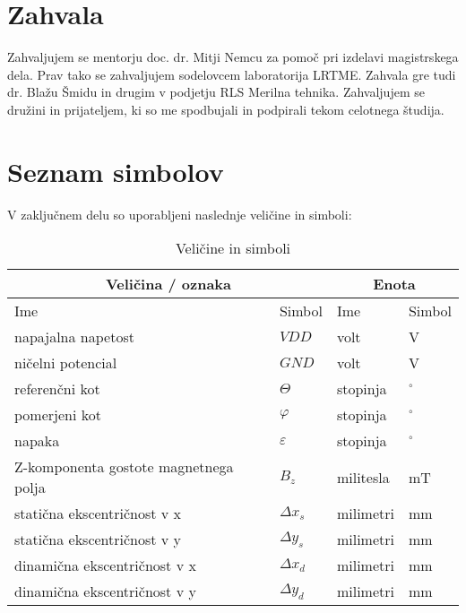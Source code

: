 \documentclass[a4paper,twoside,openright,12pt]{book}
\date{Ljubljana, 2018}
\begin{document}
\frontmatter
\maketitle
\chapter*{Zahvala}
Zahvaljujem se mentorju doc. dr. Mitji Nemcu za pomoč pri izdelavi magistrskega dela. Prav tako se zahvaljujem sodelovcem laboratorija LRTME.
Zahvala gre tudi dr. Blažu Šmidu in drugim v podjetju RLS Merilna tehnika.
Zahvaljujem se družini in prijateljem, ki so me spodbujali in podpirali tekom celotnega študija.
\tableofcontents
\chapter*{Seznam simbolov}
V zaključnem delu so uporabljeni naslednje veličine in
simboli:
\begin{table}[h]
\centering
\begin{tabular}{l l l l}
 \hline \multicolumn{2}{c}{\bf{Veličina / oznaka}} & \multicolumn{2}{c}{\bf{Enota}}  \\
 \hline
Ime & Simbol & Ime & Simbol \\\hline
 
 napajalna napetost 					&$VDD$			&volt		&V\\
 ničelni potencial 						&$GND$			&volt		&V\\
 referenčni kot 						&$\Theta$  		&stopinja 	&$^\circ$ \\
 pomerjeni kot 							&$\varphi$  	&stopinja 	&$^\circ$ \\
 napaka									&$\varepsilon$	&stopinja 	&$^\circ$ \\
 Z-komponenta gostote magnetnega polja	&$B_z$			&militesla 	&mT \\
 statična ekscentričnost v x			&$\Delta x_s$	&milimetri 	&mm \\
 statična ekscentričnost v y			&$\Delta y_s$	&milimetri 	&mm \\
 dinamična ekscentričnost v x			&$\Delta x_d$	&milimetri 	&mm \\
 dinamična ekscentričnost v y			&$\Delta y_d$	&milimetri	&mm \\
  \hline
\end{tabular}
  \caption{Veličine in simboli}
  \label{prebojne_trdnosti}
\end{table}
\mainmatter
\end{document}
